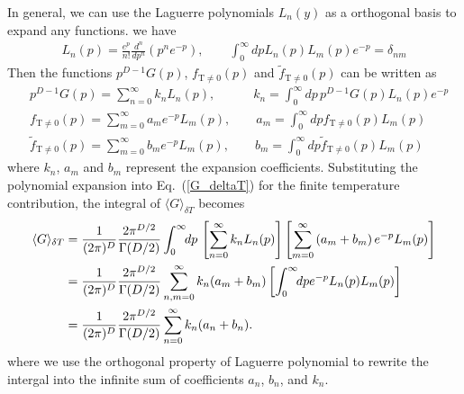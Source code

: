 \documentclass[sn-mathphys,Numbered]{sn-jnl}
\begin{document}
In general, we can use the Laguerre polynomials $L_n(y)$ as a orthogonal basis to expand any functions. we have
\begin{align}
L_n(p)=\frac{e^p}{n!}\frac{d^n}{dp^n}\left(p^ne^{-p}\right),\qquad\int_0^\infty\!\!dpL_n(p)L_m(p)e^{-p}=\delta_{nm}
\end{align}
Then the functions $p^{D-1}G(p)$, $f_\mathrm{T\neq0}(p)$ and $\tilde f_\mathrm{T\neq0}(p)$ can be written as
\begin{align}
&p^{D-1}G(p)=\sum_{n=0}^\infty k_nL_n(p),\qquad\quad k_n=\int_0^\infty\!\!dp\,p^{D-1}G(p)L_n(p)e^{-p}\\
&f_\mathrm{T\neq0}(p)=\sum_{m=0}^\infty a_m e^{-p}L_m(p),\qquad a_m=\int_0^\infty\!\!dp f_\mathrm{T\neq0}(p)L_m(p)\\
&\tilde f_\mathrm{T\neq0}(p)=\sum_{m=0}^\infty b_m e^{-p}L_m(p),\qquad b_m=\int_0^\infty\!\!dp \tilde f_\mathrm{T\neq0}(p)L_m(p)
\end{align}
where $k_n$, $a_m$ and $b_m$ represent the expansion coefficients. Substituting the polynomial expansion into Eq.~(\ref{G_deltaT}) for the finite temperature contribution, the integral of $\langle G\rangle_{\delta T}$ becomes
\begin{align}
\langle G\rangle_{\delta T}&=\frac{1}{(2\pi)^D}\frac{2\pi^{D/2}}{\Gamma(D/2)}\int^{\infty}_{0}\!\!dp\,\left[\sum_{n=0}^\infty k_nL_n(p)\right]\left[\sum_{m=0}^\infty \left(a_m+b_m\right) e^{-p}L_m(p)\right]\notag\\
&=\frac{1}{(2\pi)^D}\frac{2\pi^{D/2}}{\Gamma(D/2)}\sum_{n,m=0}^\infty k_n(a_m+b_m)\left[\int_0^\infty\!\!dp e^{-p}L_n(p)L_m(p)\right]\notag\\
&=\frac{1}{(2\pi)^D}\frac{2\pi^{D/2}}{\Gamma(D/2)}\sum^\infty_{n=0}k_n(a_n+b_n).\label{Sum000}
\end{align}
where we use the orthogonal property of Laguerre polynomial to rewrite the intergal into the infinite sum of coefficients $a_n$, $b_n$, and $k_n$.

\end{document}
